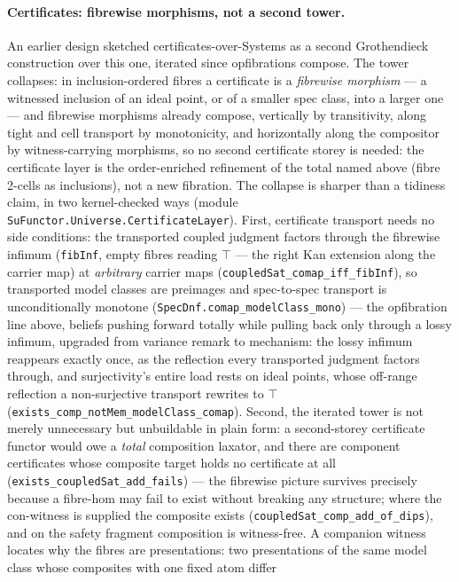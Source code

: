 \paragraph{Certificates: fibrewise morphisms, not a second tower.}
An earlier design sketched certificates-over-Systems as a second
Grothendieck construction over this one, iterated since
opfibrations compose. The tower collapses: in inclusion-ordered
fibres a certificate is a \emph{fibrewise morphism} --- a witnessed
inclusion of an ideal point, or of a smaller spec class, into a
larger one --- and fibrewise morphisms already compose, vertically
by transitivity, along tight and cell transport by monotonicity,
and horizontally along the compositor by witness-carrying
morphisms, so no second certificate storey is needed: the
certificate layer is the order-enriched refinement of the total
named above (fibre 2-cells as inclusions), not a new fibration.
The collapse is sharper than a tidiness claim, in two
kernel-checked ways (module
\texttt{SuFunctor.Universe.CertificateLayer}). First, certificate
transport needs no side conditions: the transported coupled
judgment factors through the fibrewise infimum (\texttt{fibInf},
empty fibres reading $\top$ --- the right Kan extension along the
carrier map) at \emph{arbitrary} carrier maps
(\texttt{coupledSat\_comap\_iff\_fibInf}), so transported model
classes are preimages and spec-to-spec transport is unconditionally
monotone (\texttt{SpecDnf.comap\_modelClass\_mono}) --- the
opfibration line above, beliefs pushing forward totally while
pulling back only through a lossy infimum, upgraded from variance
remark to mechanism: the lossy infimum reappears exactly once, as
the reflection every transported judgment factors through, and
surjectivity's entire load rests on ideal points, whose off-range
reflection a non-surjective transport rewrites to $\top$
(\texttt{exists\_comp\_notMem\_modelClass\_comap}). Second, the
iterated tower is not merely unnecessary but unbuildable in plain
form: a second-storey certificate functor would owe a \emph{total}
composition laxator, and there are component certificates whose
composite target holds no certificate at all
(\texttt{exists\_coupledSat\_add\_fails}) --- the fibrewise picture
survives precisely because a fibre-hom may fail to exist without
breaking any structure; where the con-witness is supplied the
composite exists (\texttt{coupledSat\_comp\_add\_of\_dips}), and on
the safety fragment composition is witness-free. A companion
witness locates why the fibres are presentations: two presentations
of the same model class whose composites with one fixed atom differ
